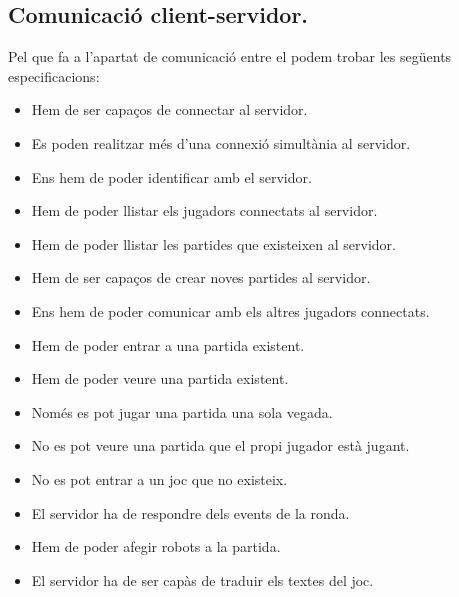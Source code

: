 \subsection{Comunicació client-servidor.}

Pel que fa a l'apartat de comunicació entre el  podem trobar les següents especificacions:

\begin{itemize}   
    \item{Hem de ser capaços de connectar al servidor.}
    \item{Es poden realitzar més d'una connexió simultània al servidor.}
    \item{Ens hem de poder identificar amb el servidor.}
    \item{Hem de poder llistar els jugadors connectats al servidor.}
    \item{Hem de poder llistar les partides que existeixen al servidor.} 
    \item{Hem de ser capaços de crear noves partides al servidor.}
    \item{Ens hem de poder comunicar amb els altres jugadors connectats.}
    \item{Hem de poder entrar a una partida existent.}
    \item{Hem de poder veure una partida existent.}
    \item{Només es pot jugar una partida una sola vegada.}
    \item{No es pot veure una partida que el propi jugador està jugant.}
    \item{No es pot entrar a un joc que no existeix.}
    \item{El servidor ha de respondre dels events de la ronda.}
    \item{Hem de poder afegir robots a la partida.}
    \item{El servidor ha de ser capàs de traduir els textes del joc.}
\end{itemize}

